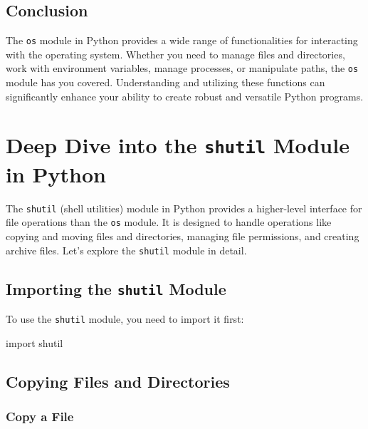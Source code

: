 \documentclass[
  letterpaper,
  DIV=11,
  numbers=noendperiod]{scrreprt}
\newenvironment{Shaded}{\begin{snugshade}}{\end{snugshade}}
\newcommand{\ImportTok}[1]{\textcolor[rgb]{0.00,0.46,0.62}{#1}}
\newcommand{\NormalTok}[1]{\textcolor[rgb]{0.00,0.23,0.31}{#1}}
\begin{document}
\section{Conclusion}\label{conclusion-28}

The \texttt{os} module in Python provides a wide range of
functionalities for interacting with the operating system. Whether you
need to manage files and directories, work with environment variables,
manage processes, or manipulate paths, the \texttt{os} module has you
covered. Understanding and utilizing these functions can significantly
enhance your ability to create robust and versatile Python programs.


\chapter{\texorpdfstring{Deep Dive into the \texttt{shutil} Module in
Python}{Deep Dive into the shutil Module in Python}}\label{deep-dive-into-the-shutil-module-in-python}

The \texttt{shutil} (shell utilities) module in Python provides a
higher-level interface for file operations than the \texttt{os} module.
It is designed to handle operations like copying and moving files and
directories, managing file permissions, and creating archive files.
Let's explore the \texttt{shutil} module in detail.

\section{\texorpdfstring{Importing the \texttt{shutil}
Module}{Importing the shutil Module}}\label{importing-the-shutil-module}

To use the \texttt{shutil} module, you need to import it first:

\begin{Shaded}
\begin{Highlighting}[]
\ImportTok{import}\NormalTok{ shutil}
\end{Highlighting}
\end{Shaded}

\section{Copying Files and
Directories}\label{copying-files-and-directories-1}

\subsection{Copy a File}\label{copy-a-file}
\end{document}
